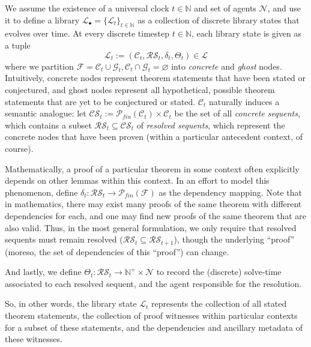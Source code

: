 \documentclass[letterpaper]{article} %
\begin{document}
We assume the existence of a universal clock $t \in \mathbb N$ and set of agents $\mathcal N$, and use it to define a library $\mathcal{L}_\bullet = \{\mathcal{L}_t\}_{t \in \mathbb{N}}$ as a collection of discrete library states that evolves over time. At every discrete timestep $t \in \mathbb{N}$, each library state is given as a tuple 
\[\mathcal{L}_t := (\mathcal{C}_t,\mathcal{RS}_t, \delta_t, \Theta_t) \in \mathscr{L}\]
where we partition $\mathcal{F} = \mathcal{C}_t \cup \mathcal{G}_t, \mathcal{C}_t \cap \mathcal{G}_t = \varnothing$ into \textit{concrete} and \textit{ghost} nodes. Intuitively, concrete nodes represent theorem statements that have been stated or conjectured, and ghost nodes represent all hypothetical, possible theorem statements that are yet to be conjectured or stated. $\mathcal{C}_t$ naturally induces a semantic analogue: let $\mathcal{CS}_t := \mathcal{P}_{fin}(\mathcal{C}_t) \times \mathcal{C}_t$ be the set of all \textit{concrete sequents}, which contains a subset $\mathcal{RS}_t \subseteq \mathcal{CS}_t$ of \textit{resolved sequents}, which represent the concrete nodes that have been proven (within a particular antecedent context, of course). 


Mathematically, a proof of a particular theorem in some context often explicitly depends on other lemmas within this context. In an effort to model this phenomenon, define $\delta_t : \mathcal{RS}_t \to \mathcal{P}_{fin}(\mathcal{F})$ as the dependency mapping.
Note that in mathematics, there may exist many proofs of the same theorem with different dependencies for each, and one may find new proofs of the same theorem that are also valid. Thus, in the most general formulation, we only require that resolved sequents must remain resolved ($\mathcal{RS}_{t} \subseteq \mathcal{RS}_{t+1}$), though the underlying ``proof'' (moreso, the set of dependencies of this ``proof'') can change.

And lastly, we define $\Theta_t : \mathcal{RS}_t\to\mathbb N^+ \times \mathcal N$ to record the (discrete) solve-time associated to each resolved sequent, and the agent responsible for the resolution. 


So, in other words, the library state $\mathcal{L}_t$ represents the collection of all stated theorem statements, the collection of proof witnesses within particular contexts for a subset of these statements, and the dependencies and ancillary metadata of these witnesses.
\end{document}
